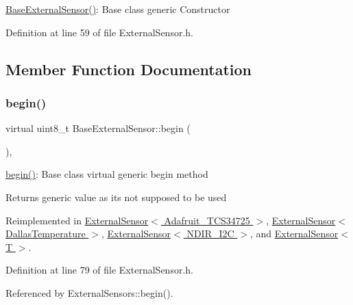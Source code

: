 \hyperlink{class_base_external_sensor_a978d96a6563b646efb358c2790a9fc6f}{Base\+External\+Sensor()}\+: Base class generic Constructor 

Definition at line 59 of file External\+Sensor.\+h.



\subsection{Member Function Documentation}
\mbox{\label{class_base_external_sensor_a87d132803d4f4fdd4e66332809f0c9a0}} 
\subsubsection{\texorpdfstring{begin()}{begin()}}
{\footnotesize\ttfamily virtual uint8\+\_\+t Base\+External\+Sensor\+::begin (\begin{DoxyParamCaption}{ }\end{DoxyParamCaption})\hspace{0.3cm}{\ttfamily [inline]}, {\ttfamily [virtual]}}

\hyperlink{class_base_external_sensor_a87d132803d4f4fdd4e66332809f0c9a0}{begin()}\+: Base class virtual generic begin method

\begin{DoxyReturn}{Returns}
generic value as it\textquotesingle{}s not supposed to be used 
\end{DoxyReturn}


Reimplemented in \hyperlink{class_external_sensor_3_01_adafruit___t_c_s34725_01_4_ad9c1d1ac1f34ce1c153a0563d9cc55df}{External\+Sensor$<$ Adafruit\+\_\+\+T\+C\+S34725 $>$}, \hyperlink{class_external_sensor_3_01_dallas_temperature_01_4_ac5275129b05e2ff8df45d5b222a661d9}{External\+Sensor$<$ Dallas\+Temperature $>$}, \hyperlink{class_external_sensor_3_01_n_d_i_r___i2_c_01_4_ac6f3614d94968ef0cc11b2b4d69cef03}{External\+Sensor$<$ N\+D\+I\+R\+\_\+\+I2\+C $>$}, and \hyperlink{class_external_sensor_ab6fe1379d55b656a048e0fba1e0a32e6}{External\+Sensor$<$ T $>$}.



Definition at line 79 of file External\+Sensor.\+h.



Referenced by External\+Sensors\+::begin().

